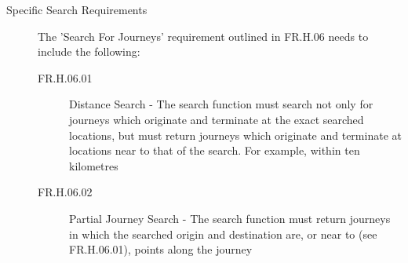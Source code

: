 \documentclass[11pt]{article}
\begin{document}
\begin{description}
\item[Specific Search Requirements] The 'Search For Journeys' requirement outlined in FR.H.06 needs to include the following:

\begin{description}

\item[FR.H.06.01] Distance Search - The search function must search not only for journeys which originate and terminate at the exact searched locations, but must return journeys which originate and terminate at locations near to that of the search. For example, within ten kilometres
\item[FR.H.06.02] Partial Journey Search - The search function must return journeys in which the searched origin and destination are, or near to (see FR.H.06.01), points along the journey
\end{description}
\end{description}
\end{document}
